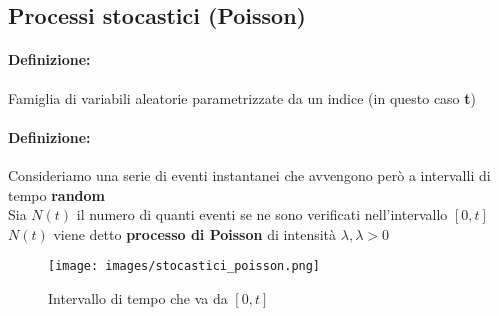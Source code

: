 \documentclass[]{article}
\newcommand{\definizione}{\paragraph{Definizione:}}
\begin{document}
    \subsection{Processi stocastici (Poisson)}
    \definizione Famiglia di variabili aleatorie parametrizzate da un indice (in questo caso \textbf{t})
    \definizione Consideriamo una serie di eventi instantanei che avvengono però a intervalli di tempo \textbf{random} \\
    Sia $N(t)$ il numero di quanti eventi se ne sono verificati nell'intervallo $[0, t]$ \\
    $N(t)$ viene detto \textbf{processo di Poisson} di intensità $\lambda, \lambda > 0$
    \begin{figure}[H]
        \caption{Intervallo di tempo che va da $[0, t]$}
        \texttt{[image: images/stocastici\_poisson.png]}
    \end{figure}
\end{document}
